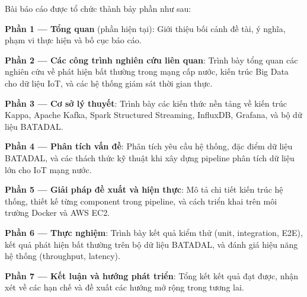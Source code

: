 Bài báo cáo được tổ chức thành bảy phần như sau:

\textbf{Phần 1 --- Tổng quan} (phần hiện tại): Giới thiệu bối cảnh đề tài, ý nghĩa,
phạm vi thực hiện và bố cục báo cáo.

\textbf{Phần 2 --- Các công trình nghiên cứu liên quan}: Trình bày tổng quan các
nghiên cứu về phát hiện bất thường trong mạng cấp nước, kiến trúc Big Data cho
dữ liệu IoT, và các hệ thống giám sát thời gian thực.

\textbf{Phần 3 --- Cơ sở lý thuyết}: Trình bày các kiến thức nền tảng về kiến trúc
Kappa, Apache Kafka, Spark Structured Streaming, InfluxDB, Grafana, và bộ dữ liệu
BATADAL.

\textbf{Phần 4 --- Phân tích vấn đề}: Phân tích yêu cầu hệ thống, đặc điểm dữ liệu
BATADAL, và các thách thức kỹ thuật khi xây dựng pipeline phân tích dữ liệu lớn
cho IoT mạng nước.

\textbf{Phần 5 --- Giải pháp đề xuất và hiện thực}: Mô tả chi tiết kiến trúc hệ
thống, thiết kế từng component trong pipeline, và cách triển khai trên môi trường
Docker và AWS EC2.

\textbf{Phần 6 --- Thực nghiệm}: Trình bày kết quả kiểm thử (unit, integration,
E2E), kết quả phát hiện bất thường trên bộ dữ liệu BATADAL, và đánh giá hiệu
năng hệ thống (throughput, latency).

\textbf{Phần 7 --- Kết luận và hướng phát triển}: Tổng kết kết quả đạt được, nhận
xét về các hạn chế và đề xuất các hướng mở rộng trong tương lai.
